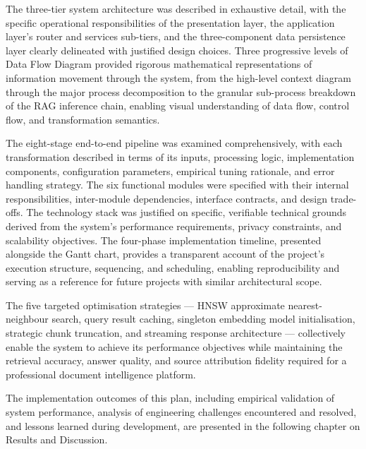 The three-tier system architecture was described in exhaustive detail, with the specific operational responsibilities of the presentation layer, the application layer's router and services sub-tiers, and the three-component data persistence layer clearly delineated with justified design choices. Three progressive levels of Data Flow Diagram provided rigorous mathematical representations of information movement through the system, from the high-level context diagram through the major process decomposition to the granular sub-process breakdown of the RAG inference chain, enabling visual understanding of data flow, control flow, and transformation semantics.

The eight-stage end-to-end pipeline was examined comprehensively, with each transformation described in terms of its inputs, processing logic, implementation components, configuration parameters, empirical tuning rationale, and error handling strategy. The six functional modules were specified with their internal responsibilities, inter-module dependencies, interface contracts, and design trade-offs. The technology stack was justified on specific, verifiable technical grounds derived from the system's performance requirements, privacy constraints, and scalability objectives. The four-phase implementation timeline, presented alongside the Gantt chart, provides a transparent account of the project's execution structure, sequencing, and scheduling, enabling reproducibility and serving as a reference for future projects with similar architectural scope.

The five targeted optimisation strategies --- HNSW approximate nearest-neighbour search, query result caching, singleton embedding model initialisation, strategic chunk truncation, and streaming response architecture --- collectively enable the system to achieve its performance objectives while maintaining the retrieval accuracy, answer quality, and source attribution fidelity required for a professional document intelligence platform.

The implementation outcomes of this plan, including empirical validation of system performance, analysis of engineering challenges encountered and resolved, and lessons learned during development, are presented in the following chapter on Results and Discussion.